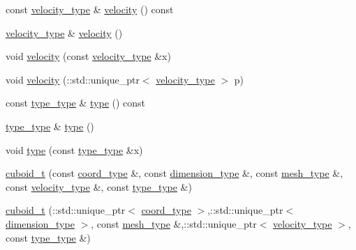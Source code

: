 \begin{DoxyCompactItemize}
\item 
const \hyperlink{classcuboid__t_a71c58ac42113feacf576245bc43d8dde}{velocity\+\_\+type} \& \hyperlink{classcuboid__t_a0a63a4f09fcc1006371cd5074aa5daa1}{velocity} () const 
\item 
\hyperlink{classcuboid__t_a71c58ac42113feacf576245bc43d8dde}{velocity\+\_\+type} \& \hyperlink{classcuboid__t_ac6f84c9ffb3b3bd15ef46dfe9f7488aa}{velocity} ()
\item 
void \hyperlink{classcuboid__t_a5792df33b443ebb4567d6065e7220e55}{velocity} (const \hyperlink{classcuboid__t_a71c58ac42113feacf576245bc43d8dde}{velocity\+\_\+type} \&x)
\item 
void \hyperlink{classcuboid__t_aa94c0a4c68e70db1bd5e966b2ceb4795}{velocity} (\+::std\+::unique\+\_\+ptr$<$ \hyperlink{classcuboid__t_a71c58ac42113feacf576245bc43d8dde}{velocity\+\_\+type} $>$ p)
\item 
const \hyperlink{classcuboid__t_a6fb75392e8d31d56062e18b6aa2adc8a}{type\+\_\+type} \& \hyperlink{classcuboid__t_a55195bf6362bb4a82c568d6561a4a00d}{type} () const 
\item 
\hyperlink{classcuboid__t_a6fb75392e8d31d56062e18b6aa2adc8a}{type\+\_\+type} \& \hyperlink{classcuboid__t_a1e4471fb01f14bb97ef46d94f4cc22e9}{type} ()
\item 
void \hyperlink{classcuboid__t_ae312cc3a069b53e3c09c5bdca5279ef1}{type} (const \hyperlink{classcuboid__t_a6fb75392e8d31d56062e18b6aa2adc8a}{type\+\_\+type} \&x)
\item 
\hyperlink{classcuboid__t_a806788c361e57c13e1d5f59637ebcdce}{cuboid\+\_\+t} (const \hyperlink{classcuboid__t_aa3c19ea94c59ed982641ca39a420a041}{coord\+\_\+type} \&, const \hyperlink{classcuboid__t_a0992ec1724eb71e76babf752bbe9189b}{dimension\+\_\+type} \&, const \hyperlink{classcuboid__t_a48025da79e9243b8b1e34e696c22e06d}{mesh\+\_\+type} \&, const \hyperlink{classcuboid__t_a71c58ac42113feacf576245bc43d8dde}{velocity\+\_\+type} \&, const \hyperlink{classcuboid__t_a6fb75392e8d31d56062e18b6aa2adc8a}{type\+\_\+type} \&)
\item 
\hyperlink{classcuboid__t_a22c19e96f12141bafd1b6ad465a1f1f3}{cuboid\+\_\+t} (\+::std\+::unique\+\_\+ptr$<$ \hyperlink{classcuboid__t_aa3c19ea94c59ed982641ca39a420a041}{coord\+\_\+type} $>$,\+::std\+::unique\+\_\+ptr$<$ \hyperlink{classcuboid__t_a0992ec1724eb71e76babf752bbe9189b}{dimension\+\_\+type} $>$, const \hyperlink{classcuboid__t_a48025da79e9243b8b1e34e696c22e06d}{mesh\+\_\+type} \&,\+::std\+::unique\+\_\+ptr$<$ \hyperlink{classcuboid__t_a71c58ac42113feacf576245bc43d8dde}{velocity\+\_\+type} $>$, const \hyperlink{classcuboid__t_a6fb75392e8d31d56062e18b6aa2adc8a}{type\+\_\+type} \&)

\end{DoxyCompactItemize}
